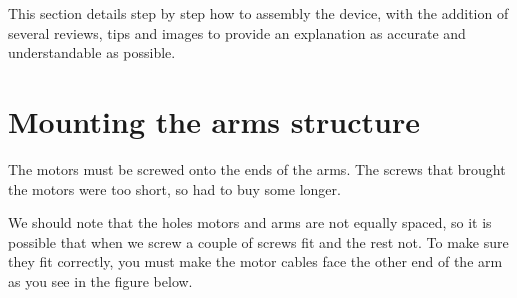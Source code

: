 \documentclass[12pt, a4paper,twoside]{tesi_upf}
\begin{document}
This section details step by step how to assembly the device, with the addition of several reviews, tips and images to provide an explanation as accurate and understandable as possible.

\section{Mounting the arms structure}

The motors must be screwed onto the ends of the arms. The screws that brought the motors were too short, so had to buy some longer.

\noindent%
\begin{minipage}{\linewidth}
\vspace{10 mm}
\label{screwDifferences}
\end{minipage}    
\clearpage

We should note that the holes motors and arms are not equally spaced, so it is possible that when we screw a couple of screws fit and the rest not. To make sure they fit correctly, you must make the motor cables face the other end of the arm as you see in the figure below.

\noindent%
\begin{minipage}{\linewidth}
\vspace{10 mm}
\label{motorArm}
\end{minipage}    
\\[12pt]
\end{document}
